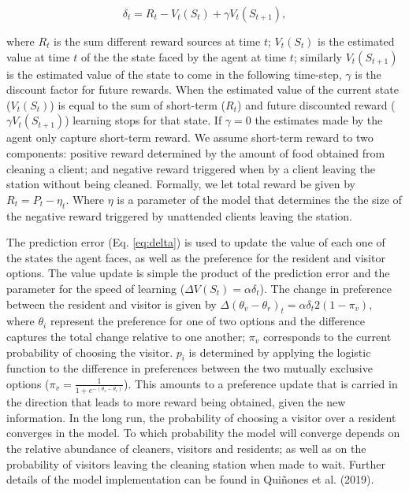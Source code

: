 \documentclass[
  12pt,
]{article}
\begin{document}
\begin{equation}
\delta_t = R_t -  V_t(S_t) + \gamma V_t(S_{t+1}) ,
\label{eq:delta}
\end{equation}

where \(R_t\) is the sum different reward sources at time \(t\);
\(V_t(S_t)\) is the estimated value at time \(t\) of the the state faced
by the agent at time \(t\); similarly \(V_t(S_{t+1})\) is the estimated
value of the state to come in the following time-step, \(\gamma\) is the
discount factor for future rewards. When the estimated value of the
current state (\(V_t(S_t)\)) is equal to the sum of short-term (\(R_t\))
and future discounted reward (\(\gamma V_t(S_{t+1})\)) learning stops
for that state. If \(\gamma = 0\) the estimates made by the agent only
capture short-term reward. We assume short-term reward to two
components: positive reward determined by the amount of food obtained
from cleaning a client; and negative reward triggered when by a client
leaving the station without being cleaned. Formally, we let total reward
be given by \(R_t=P_t - \eta_t\). Where \(\eta\) is a parameter of the
model that determines the the size of the negative reward triggered by
unattended clients leaving the station.

The prediction error (Eq. \ref{eq:delta}) is used to update the value of
each one of the states the agent faces, as well as the preference for
the resident and visitor options. The value update is simple the product
of the prediction error and the parameter for the speed of learning
(\(\Delta V(S_t)=\alpha \delta_t\)). The change in preference between
the resident and visitor is given by
\(\Delta (\theta_v-\theta_r)_t=\alpha\delta_t2(1-\pi_v)\), where
\(\theta_i\) represent the preference for one of two options and the
difference captures the total change relative to one another; \(\pi_v\)
corresponds to the current probability of choosing the visitor. \(p_i\)
is determined by applying the logistic function to the difference in
preferences between the two mutually exclusive options
(\(\pi_v=\frac{1}{1+e^{-(\theta_v-\theta_r)}}\)). This amounts to a
preference update that is carried in the direction that leads to more
reward being obtained, given the new information. In the long run, the
probability of choosing a visitor over a resident converges in the
model. To which probability the model will converge depends on the
relative abundance of cleaners, visitors and residents; as well as on
the probability of visitors leaving the cleaning station when made to
wait. Further details of the model implementation can be found in
Quiñones et al. (2019).
\end{document}

